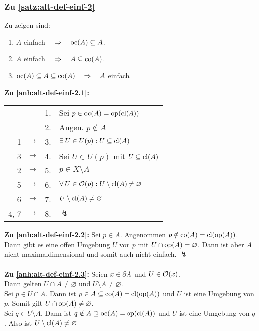 \subsubsection{Zu \ref{satz:alt-def-einf-2}}\label{anh:alt-def-einf-2}
    Zu zeigen sind:
    \begin{enumerate}
        \item \label{anh:alt-def-einf-2.1} $A$ einfach $\quad \Rightarrow \quad \text{oc}(A) \subseteq A$.
        \item \label{anh:alt-def-einf-2.2} $A$ einfach $\quad \Rightarrow \quad A \subseteq \text{co}(A)$. 
        \item \label{anh:alt-def-einf-2.3} $\text{oc}(A) \subseteq A \subseteq \text{co}(A) \quad \Rightarrow \quad A$ einfach.
    \end{enumerate}
%
    \noindent
    \textbf{Zu \ref{anh:alt-def-einf-2.1}:}
    \begin{longtable}{r c c l}
        & & 1. & Sei $p \in \text{oc}(A) = \text{op}(\text{cl}(A))$\\
        & & 2. & Angen. $p \notin A$ \\
        1 & $\rightarrow$ & 3. & $\exists\: U \in U(p) : U \subseteq \text{cl}(A)$ \\
        3 & $\rightarrow$ & 4. & Sei $U \in U(p)$ mit $U \subseteq \text{cl}(A)$ \\
        2 & $\rightarrow$ & 5. & $p \in X \setminus A$ \\
        5 & $\rightarrow$ & 6. & $\forall\: U \in \mathcal{O}(p): U \setminus \text{cl}(A) \neq \varnothing$ \\
        6 & $\rightarrow$ & 7. & $U \setminus \text{cl}(A) \neq \varnothing$ \\
        4, 7 & $\rightarrow$ & 8. & $\lightning$
    \end{longtable}	
%
    \noindent
    \textbf{Zu \ref{anh:alt-def-einf-2.2}:}
    Sei $p \in A$. Angenommen $p \notin \text{co}(A) = \text{cl}(\text{op}(A))$. Dann gibt es eine offen Umgebung $U$ von $p$ mit $U \cap \text{op}(A) = \varnothing$. Dann ist aber $A$ nicht maximaldimensional und somit auch nicht einfach. $\lightning$\\ \ \\
%
    \noindent
    \textbf{Zu \ref{anh:alt-def-einf-2.3}:}
    Seien ${x \in \partial A}$ und $U \in \mathcal{O}(x)$.\\
    Dann gelten $U \cap A \neq \varnothing$ und $U \setminus A \neq \varnothing$.\\
    Sei $p \in U \cap A$. Dann ist $p \in A \subseteq \text{co}(A) = \text{cl}(\text{op}(A))$ und $U$ ist eine Umgebung von $p$. Somit gilt $U \cap \text{op}(A) \neq \varnothing$.\\
    Sei $q \in U \setminus A$. Dann ist $q \notin A \supseteq \text{oc}(A) = \text{op}(\text{cl}(A))$ und $U$ ist eine Umgebung von $q$. Also ist $U \setminus \text{cl}(A) \neq \varnothing$
    

